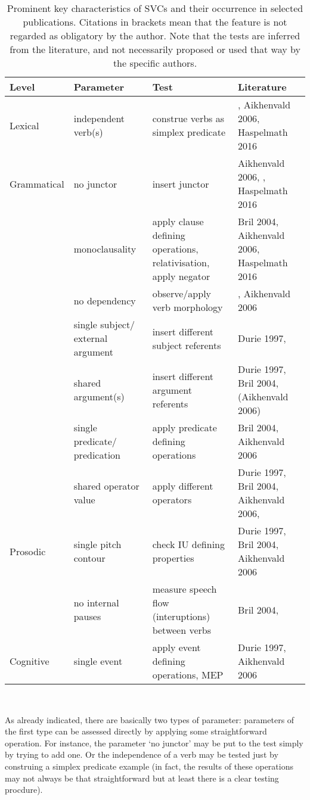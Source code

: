 \begin{table}
\begin{scriptsize}
\begin{tabular}{l L{3.5cm} L{3.5cm} L{3.5cm}}
\hline \textbf{Level} & \textbf{Parameter} & \textbf{Test} & \textbf{Literature} \\
\hline Lexical & independent verb(s) & construe verbs as simplex predicate & \cite{bril2004complex}, Aikhenvald 2006, Haspelmath 2016 \\
\hline Grammatical & no junctor & insert junctor & Aikhenvald 2006, \cite{muysken2006serial}, Haspelmath 2016 \\
 & monoclausality & apply clause defining operations, relativisation, apply negator & Bril 2004, Aikhenvald 2006, Haspelmath 2016 \\
 & no dependency & observe/apply verb morphology & \cite{Durie1997}, Aikhenvald 2006 \\
 & single subject/ external argument & insert different subject referents & Durie 1997, \cite{muysken2006serial} \\
 & shared argument(s) & insert different argument referents & Durie 1997, Bril 2004, (Aikhenvald 2006) \\
 & single predicate/ predication & apply predicate defining operations & Bril 2004, Aikhenvald 2006 \\
 & shared operator value & apply different operators & Durie 1997, Bril 2004, Aikhenvald 2006, \cite{muysken2006serial} \\
\hline Prosodic & single pitch contour & check IU defining properties & Durie 1997, Bril 2004, Aikhenvald 2006 \\
 & no internal pauses & measure speech flow (interuptions) between verbs & Bril 2004, \cite{muysken2006serial} \\
\hline Cognitive & single event & apply event defining operations, MEP & Durie 1997, Aikhenvald 2006 \\
\hline
\end{tabular}
\caption[Key characteristics of SVCs]{Prominent key characteristics of SVCs and their occurrence in selected publications. Citations in brackets mean that the feature is not regarded as obligatory by the author. Note that the tests are inferred from the literature, and not necessarily proposed or used that way by the specific authors.} \label{tab:keyfeatsvc}
\end{scriptsize}
\end{table}
\

As already indicated, there are basically two types of parameter: parameters of the first type can be assessed directly by applying some straightforward operation. For instance, the parameter `no junctor' may be put to the test simply by trying to add one. Or the independence of a verb may be tested just by construing a simplex predicate example (in fact, the results of these operations may not always be that straightforward but at least there is a clear testing procdure). 

